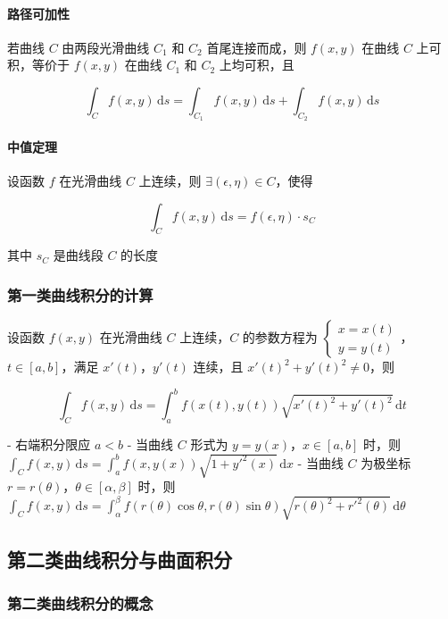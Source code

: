 \documentclass[lang = zh , final , oneside , openany , titlepage , zihao = -4 , linespread = 1.3 , baselineskip = false , cjk-font = windows , text-font = newtx , math-font = newtx]{sjtureport}
\begin{document}
\paragraph{路径可加性}

若曲线 \(C\) 由两段光滑曲线 \(C_1\) 和 \(C_2\) 首尾连接而成，则 \(f(x,y)\) 在曲线 \(C\) 上可积，等价于 \(f(x,y)\) 在曲线 \(C_1\) 和 \(C_2\) 上均可积，且

\[
\int_C f(x,y)\,\mathrm{d}s = \int_{C_1} f(x,y)\,\mathrm{d}s + \int_{C_2} f(x,y)\,\mathrm{d}s
\]

\paragraph{中值定理}

设函数 \(f\) 在光滑曲线 \(C\) 上连续，则 \(\exists (\epsilon,\eta)\in C\)，使得

\[
\int_C f(x,y)\,\mathrm{d}s = f(\epsilon,\eta)\cdot s_C
\]

其中 \(s_C\) 是曲线段 \(C\) 的长度

\subsubsection{第一类曲线积分的计算}

设函数 \(f(x,y)\) 在光滑曲线 \(C\) 上连续，\(C\) 的参数方程为 \(\begin{cases}x = x(t)\\y = y(t)\end{cases}\)，\(t\in [a,b]\)，满足 \(x'(t)\)，\(y'(t)\) 连续，且 \(x'(t)^2 + y'(t)^2 \neq 0\)，则

\[
\int_C f(x,y)\,\mathrm{d}s = \int_a^b f(x(t),y(t))\sqrt{x'(t)^2 + y'(t)^2}\,\mathrm{d}t
\]

- 右端积分限应 \(a < b\)
- 当曲线 \(C\) 形式为 \(y = y(x)\)，\(x\in [a,b]\) 时，则 \(\int_Cf(x,y)\,\mathrm{d}s =\int_a^bf(x,y(x))\sqrt{1 + y'^2(x)}\,\mathrm{d}x\)
- 当曲线 \(C\) 为极坐标 \(r = r(\theta)\)，\(\theta\in [\alpha,\beta]\) 时，则 \(\int_Cf(x,y)\,\mathrm{d}s = \int_\alpha^\beta f(r(\theta)\cos\theta,r(\theta)\sin\theta)\sqrt{r(\theta)^2 + r'^2(\theta)}\,\mathrm{d}\theta\)

\subsection{第二类曲线积分与曲面积分}

\subsubsection{第二类曲线积分的概念}
\end{document}
